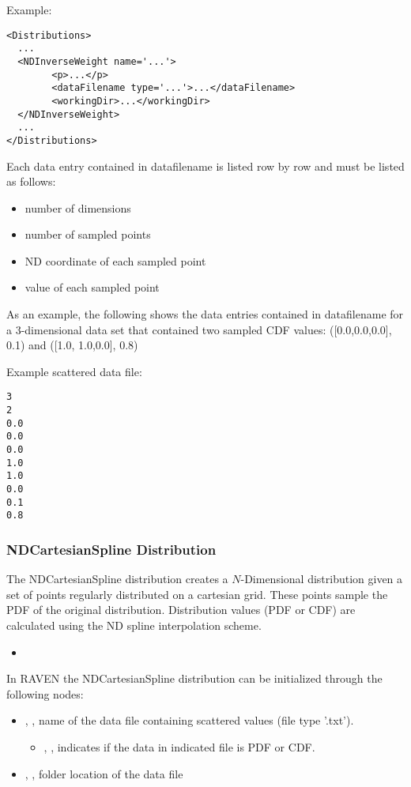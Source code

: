 Example:
\begin{lstlisting}[style=XML]
<Distributions>
  ...
  <NDInverseWeight name='...'>
        <p>...</p>
        <dataFilename type='...'>...</dataFilename>
        <workingDir>...</workingDir>
  </NDInverseWeight>
  ...
</Distributions>
\end{lstlisting}

Each data entry contained in data\textunderscore filename is listed row by row and must be listed as follows:
\begin{itemize}
\item number of dimensions
\item number of sampled points
\item ND coordinate of each sampled point
\item value of each sampled point
\end{itemize}

As an example, the following shows the data entries contained in data\textunderscore filename for a 3-dimensional data set that contained two sampled CDF values: ([0.0,0.0,0.0], 0.1) and ([1.0, 1.0,0.0], 0.8)

Example scattered data file:
\begin{lstlisting}
3
2
0.0
0.0
0.0
1.0
1.0
0.0
0.1
0.8
\end{lstlisting}

\subsubsection{NDCartesianSpline Distribution}
\label{NDCartesianSpline}

The NDCartesianSpline distribution creates a $N$-Dimensional distribution given a set of points
regularly distributed on a cartesian grid. These points sample the PDF of the original distribution.
Distribution values (PDF or CDF) are calculated using the ND spline
interpolation scheme.


%
\attrsIntro
\vspace{-5mm}
\begin{itemize}
\itemsep0em
\item \nameDescription
\end{itemize}
\vspace{-5mm}


In RAVEN the NDCartesianSpline distribution can be initialized through the following nodes:
\begin{itemize}
\item {}, ,  name of the data file containing scattered values (file type '.txt').
\begin{itemize}
\item {}, , indicates if the data in indicated file is PDF or CDF.
\end{itemize}
\item {}, , folder location of the data file
\end{itemize}

